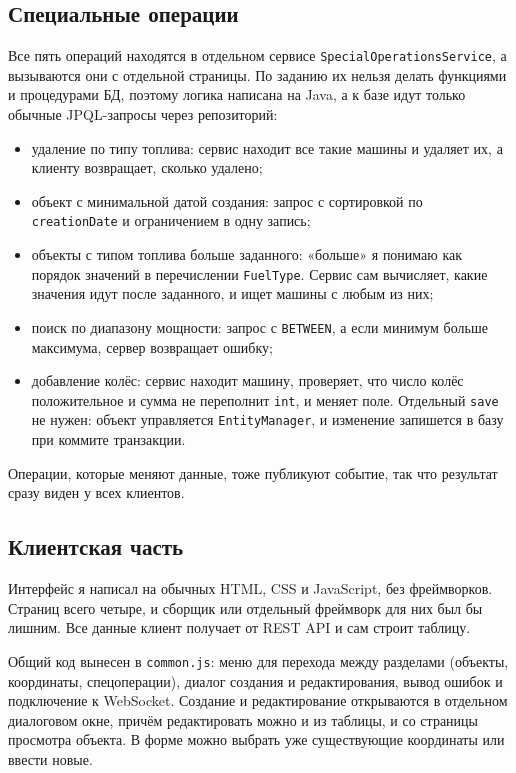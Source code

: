 \documentclass[a4paper,12pt]{article}
\begin{document}
\subsection{Специальные операции}

Все пять операций находятся в отдельном сервисе
\texttt{Special\-Operations\-Service}, а вызываются они с отдельной страницы. По заданию их нельзя делать функциями и процедурами БД, поэтому логика написана на Java, а к базе идут только обычные JPQL-запросы через репозиторий:

\begin{itemize}[leftmargin=1.2cm]
    \item удаление по типу топлива: сервис находит все такие машины и удаляет их, а клиенту возвращает, сколько удалено;
    \item объект с минимальной датой создания: запрос с сортировкой по \texttt{creationDate} и ограничением в одну запись;
    \item объекты с типом топлива больше заданного: «больше» я понимаю как порядок значений в перечислении \texttt{FuelType}. Сервис сам вычисляет, какие значения идут после заданного, и ищет машины с любым из них;
    \item поиск по диапазону мощности: запрос с \texttt{BETWEEN}, а если минимум больше максимума, сервер возвращает ошибку;
    \item добавление колёс: сервис находит машину, проверяет, что число колёс положительное и сумма не переполнит \texttt{int}, и меняет поле. Отдельный \texttt{save} не нужен: объект управляется \texttt{EntityManager}, и изменение запишется в базу при коммите транзакции.
\end{itemize}

Операции, которые меняют данные, тоже публикуют событие, так что результат сразу виден у всех клиентов.

\subsection{Клиентская часть}

Интерфейс я написал на обычных HTML, CSS и JavaScript, без фреймворков. Страниц всего четыре, и сборщик или отдельный фреймворк для них был бы лишним. Все данные клиент получает от REST API и сам строит таблицу.

Общий код вынесен в \texttt{common.js}: меню для перехода между разделами (объекты, координаты, спецоперации), диалог создания и редактирования, вывод ошибок и подключение к WebSocket. Создание и редактирование открываются в отдельном диалоговом окне, причём редактировать можно и из таблицы, и со страницы просмотра объекта. В форме можно выбрать уже существующие координаты или ввести новые.
\end{document}
